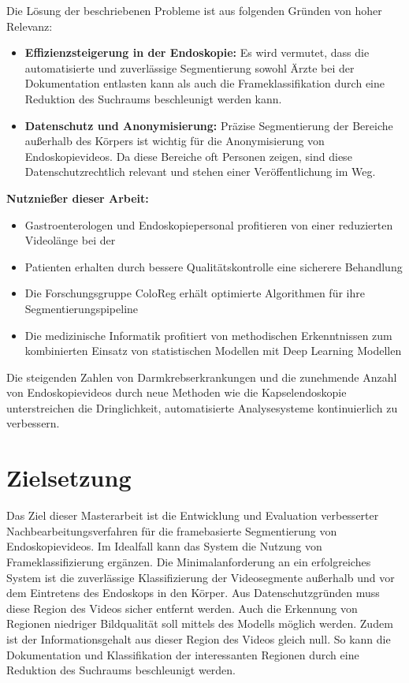 Die Lösung der beschriebenen Probleme ist aus folgenden Gründen von hoher Relevanz:

\begin{itemize}
\item \textbf{Effizienzsteigerung in der Endoskopie:} Es wird vermutet, dass die automatisierte und zuverlässige Segmentierung sowohl Ärzte bei der Dokumentation entlasten kann als auch die Frameklassifikation durch eine Reduktion des Suchraums beschleunigt werden kann.

\item \textbf{Datenschutz und Anonymisierung:} Präzise Segmentierung der Bereiche außerhalb des Körpers ist wichtig für die Anonymisierung von Endoskopievideos. Da diese Bereiche oft Personen zeigen, sind diese Datenschutzrechtlich relevant und stehen einer Veröffentlichung im Weg.
\end{itemize}

\textbf{Nutznießer dieser Arbeit:}
\begin{itemize}
\item Gastroenterologen und Endoskopiepersonal profitieren von einer reduzierten Videolänge bei der
\item Patienten erhalten durch bessere Qualitätskontrolle eine sicherere Behandlung  
\item Die Forschungsgruppe ColoReg erhält optimierte Algorithmen für ihre Segmentierungspipeline
\item Die medizinische Informatik profitiert von methodischen Erkenntnissen zum kombinierten Einsatz von statistischen Modellen mit Deep Learning Modellen
\end{itemize}

Die steigenden Zahlen von Darmkrebserkrankungen \citep{acs-2024,ferlay-2024} und die zunehmende Anzahl von Endoskopievideos durch neue Methoden wie die Kapselendoskopie \citep{koulaouzidis-2021} unterstreichen die Dringlichkeit, automatisierte Analysesysteme kontinuierlich zu verbessern.

\section{Zielsetzung}\label{sec:zielsetzung}

Das Ziel dieser Masterarbeit ist die Entwicklung und Evaluation verbesserter Nachbearbeitungsverfahren für die framebasierte Segmentierung von Endoskopievideos. Im Idealfall kann das System die Nutzung von Frameklassifizierung ergänzen. Die Minimalanforderung an ein erfolgreiches System ist die zuverlässige Klassifizierung der Videosegmente außerhalb und vor dem Eintretens des Endoskops in den Körper. Aus Datenschutzgründen muss diese Region des Videos sicher entfernt werden. Auch die Erkennung von Regionen niedriger Bildqualität soll mittels des Modells möglich werden. Zudem ist der Informationsgehalt aus dieser Region des Videos gleich null. So kann die Dokumentation und Klassifikation der interessanten Regionen durch eine Reduktion des Suchraums beschleunigt werden.

